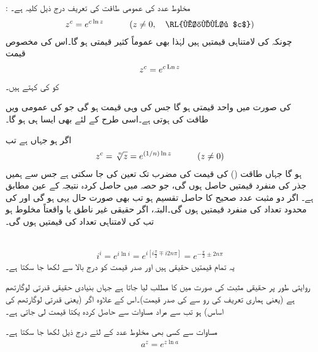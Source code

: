 : مخلوط عدد  کی عمومی طاقت کی تعریف درج ذیل کلیہ ہے۔
\begin{align}\label{مساوات_مخلوط_لوگارتھم_ث}
z^c=e^{c\ln z}\quad \quad \quad (z\ne 0, \quad \text{\RL{مخلوط $c$}})
\end{align}
چونکہ  کی لامتناہی قیمتیں ہیں لہٰذا  بھی عموماً کثیر قیمتی ہو گا۔اس کی مخصوص قیمت
\begin{align*}
z^c=e^{c\operatorname{Ln} z}
\end{align*}
کو  کی  کہتے ہیں۔

 کی صورت میں  واحد قیمتی ہو گا جس کی وہی قیمت ہو گی جو   کی عمومی  ویں طاقت کی ہوتی ہے۔اسی طرح  کے لئے بھی ایسا ہی ہو گا۔

اگر  ہو جہاں  ہے تب
\begin{align*}
z^c=\sqrt[\leftroot{-2}\uproot{2}n]{z}=e^{(1/n)\ln z}\quad \quad \quad (z\ne 0)
\end{align*}
ہو گا جہاں طاقت () کی قیمت  کی مضرب تک تعین کی جا سکتی ہے جس سے ہمیں جذر کی  منفرد قیمتیں حاصل ہوں گی، جو حصہ  میں حاصل کردہ نتیجہ کے عین مطابق ہے۔ اگر  دو مثبت عدد صحیح کا حاصل تقسیم ہو تب بھی صورت حال یہی ہو گی اور  کی محدود تعداد کی منفرد قیمتیں ہوں گی۔البتہ، اگر  حقیقی غیر ناطق یا واقعتاً مخلوط ہو تب  کی لامتناہی تعداد کی قیمتیں ہوں گی۔ 

\quad {}\\
\begin{align*}
i^i=e^{i\ln i}=e^{i[i\tfrac{\pi}{2}\mp i2n\pi]}=e^{-\tfrac{\pi}{2}\pm 2n\pi}
\end{align*}
یہ تمام قیمتیں حقیقی ہیں اور صدر قیمت  کو درج بالا سے  لکھا جا سکتا ہے۔

روایتی طور پر حقیقی مثبت  کی صورت میں  کا مطلب  لیا جاتا ہے جہاں  بنیادی حقیقی قدرتی لوگارتھم ہے (یعنی ہماری تعریف کی رو سے   کی صدر قیمت)۔اس کے علاوہ اگر  (یعنی قدرتی لوگارتھم کی اساس) ہو تب  سے مراد مساوات  سے حاصل کردہ یکتا قیمت لی جاتی ہے۔

مساوات  سے کسی بھی مخلوط عدد  کے لئے درج ذیل لکھا جا سکتا ہے۔
\begin{align}\label{مساوات_مخلوط_لوگارتھم_ج}
a^z=e^{z\ln a}
\end{align}

